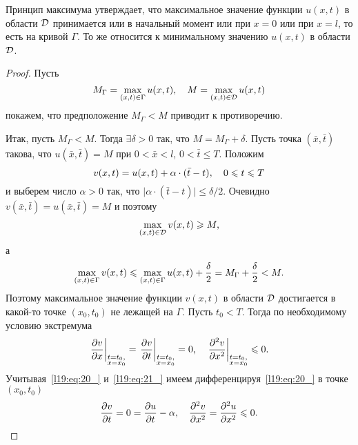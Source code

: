 Принцип максимума утверждает, что максимальное значение функции $u(x,t)$ в области $\mathcal{D}$ принимается или в начальный момент или при $x=0$ или при $x=l$, то есть на кривой $\Gamma$. То же относится к минимальному значению  $u(x,t)$ в области $\mathcal{D}$.
\begin{proof}
	Пусть
	\begin{equation*}
		\hfill M_{\Gamma}=\max\limits_{(x,t)\in\Gamma}u(x,t),\quad M=\max\limits_{(x,t)\in\mc{D}}u(x,t)\hfill
	\end{equation*}
	покажем, что предположение $M_{\Gamma}<M$ приводит к противоречию.
	
	Итак, пусть $M_{\Gamma}<M$. Тогда $\exists\delta>0$ так, что $M=M_{\Gamma}+\delta$. Пусть точка $(\bar{x},\bar{t})$ такова, что $u(\bar{x},\bar{t})=M$ при $0<\bar{x}<l$, $0<\bar{t}\leqslant T$. Положим
	\begin{equation}\label{l19:eq:20_}
		\hfill v(x,t)=u(x,t)+\alpha\cdot(\bar{t}-t),\quad 0\leqslant t\leqslant T\hfill
	\end{equation}
	и выберем число $\alpha>0$ так, что $\big|\alpha\cdot(\bar{t}-t)\big|\leqslant\delta/2$. Очевидно $v(\bar{x},\bar{t})=u(\bar{x},\bar{t})=M$ и поэтому
	\begin{equation*}
		\hfill\max\limits_{(x,t)\in\mc{D}}v(x,t)\geqslant M,\hfill
	\end{equation*}
	а 
	\begin{equation*}
		\hfill\max\limits_{(x,t)\in\Gamma}v(x,t)\leqslant \max\limits_{(x,t)\in\Gamma}u(x,t)+\frac{\delta}{2}=M_{\Gamma}+\frac{\delta}{2}<M.\hfill
	\end{equation*} 
	Поэтому максимальное значение функции $v(x,t)$ в области $\mathcal{D}$ достигается в какой-то точке $(x_0,t_0)$ не лежащей на $\Gamma$. Пусть $t_0<T$. Тогда по необходимому условию экстремума 
	\begin{equation}\label{l19:eq:21_}
		\hfill\left.\pder{v}{x}\right|_{\substack{t=t_0,\\ x=x_0}}=\left.\pder{v}{t}\right|_{\substack{t=t_0,\\ x=x_0}}=0,\quad \left.\pdder{v}{x}\right|_{\substack{t=t_0,\\ x=x_0}}\leqslant0.\hfill
	\end{equation}
	Учитывая~\eqref{l19:eq:20_} и~\eqref{l19:eq:21_} имеем дифференцируя~\eqref{l19:eq:20_} в точке $(x_0,t_0)$
	\begin{equation*}
		\hfill\pder{v}{t}=0=\pder{u}{t}-\alpha,\quad\pdder{v}{x}=\pdder{u}{x}\leqslant0.\hfill
	\end{equation*}

\end{proof}
